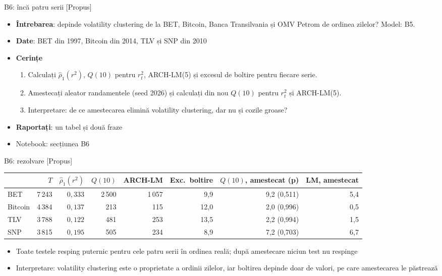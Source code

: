 \begin{frame}{B6: încă patru serii [Propus]}
\itemsize{\footnotesize}
\begin{itemize}
\item \textbf{Întrebarea}: depinde volatility clustering de la BET, Bitcoin, Banca Transilvania și OMV Petrom de ordinea zilelor? Model: B5.
\item \textbf{Date}: BET din 1997, Bitcoin din 2014, TLV și SNP din 2010
\item \textbf{Cerințe}
\begin{enumerate}
    \item Calculați $\hat\rho_1(r^2)$, $Q(10)$ pentru $r_t^2$, ARCH-LM(5) și excesul de boltire pentru fiecare serie.
    \item Amestecați aleator randamentele (seed 2026) și calculați din nou $Q(10)$ pentru $r_t^2$ și ARCH-LM(5).
    \item Interpretare: de ce amestecarea elimină volatility clustering, dar nu și cozile groase?
\end{enumerate}
\item \textbf{Raportați}: un tabel și două fraze
\item Notebook: secțiunea B6
\end{itemize}
\end{frame}

\ifsolutions
\begin{frame}{B6: rezolvare [Propus]}
\itemsize{\footnotesize}
\begin{center}
\footnotesize
\begin{tabular}{lrrrrrrr}
\toprule
& $T$ & $\hat\rho_1(r^2)$ & $Q(10)$ & ARCH-LM & \textbf{Exc.\ boltire} & $Q(10)$, \textbf{amestecat} (p) & \textbf{LM, amestecat} \\
\midrule
BET & 7\,243 & $0{,}333$ & 2\,500 & 1\,057 & 9{,}9 & 9{,}2 (0{,}511) & 5{,}4 \\
Bitcoin & 4\,384 & $0{,}137$ & 213 & 115 & 12{,}0 & 2{,}0 (0{,}996) & 0{,}5 \\
TLV & 3\,788 & $0{,}122$ & 481 & 253 & 13{,}5 & 2{,}2 (0{,}994) & 1{,}5 \\
SNP & 3\,815 & $0{,}195$ & 505 & 234 & 8{,}9 & 7{,}2 (0{,}703) & 6{,}7 \\
\bottomrule
\end{tabular}
\end{center}
\begin{itemize}
    \item Toate testele resping puternic pentru cele patru serii în ordinea reală; după amestecare niciun test nu respinge
    \item Interpretare: volatility clustering este o proprietate a ordinii zilelor, iar boltirea depinde doar de valori, pe care amestecarea le păstrează
\end{itemize}
\end{frame}
\fi

